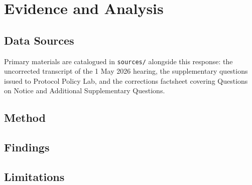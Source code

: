 \chapter{Evidence and Analysis}
\label{ch:evidence}


\section{Data Sources}
\label{sec:evidence:sources}

Primary materials are catalogued in \texttt{sources/} alongside this response: the uncorrected transcript of the 1 May 2026 hearing, the supplementary questions issued to Protocol Policy Lab, and the corrections factsheet covering Questions on Notice and Additional Supplementary Questions.

\section{Method}
\label{sec:evidence:method}

\lipsum[1]

\section{Findings}
\label{sec:evidence:findings}

\lipsum[2-3]

\section{Limitations}
\label{sec:evidence:limitations}

\lipsum[4]

